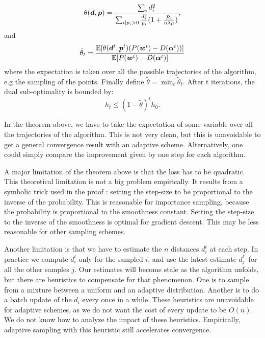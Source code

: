 \begin{subappendices}
\begin{theorem}
	\begin{equation}
		\theta(\bm d, \bm p) = \frac{\sum_i d_i^2}{\sum_{i | p_i >0} \frac{d_i^2}{p_i} (1+ \frac{R_i}{n \lambda \mu}) },
	\end{equation}
	and
	\begin{equation}
		\tilde \theta_t =  \frac{\operatorname{\mathbb{E}}[\theta(\bm d^t,\bm p^t) (P(\boldsymbol{w}^t) - D(\boldsymbol{\alpha}^t))] }{ \operatorname{\mathbb{E}}[P(\boldsymbol{w}^t) - D(\boldsymbol{\alpha}^t) ] }
	\end{equation}
	where the expectation is taken over all the possible trajectories of the algorithm, e.g the sampling of the points.
	Finally define $\tilde \theta = \min_t \tilde \theta_t$.
	After t iterations, the dual sub-optimality is bounded by:
	\begin{equation}
		h_t \leq (1- \tilde \theta )^t  h_0.
	\end{equation}
\end{theorem}

In the theorem above, we have to take the expectation of some variable over all the trajectories of the algorithm.
This is not very clean, but this is unavoidable to get a general convergence result with an adaptive scheme.
Alternatively, one could simply compare the improvement given by one step for each algorithm.

A major limitation of the theorem above is that the loss has to be quadratic.
This theoretical limitation is not a big problem empirically.
It results from a symbolic trick used in the proof : setting the step-size to be proportional to the inverse of the probability.
This is reasonable for importance sampling, because the probability is proportional to the smoothness constant.
Setting the step-size to the inverse of the smoothness is optimal for gradient descent.
This may be less reasonable for other sampling schemes.

Another limitation is that we have to estimate the $n$ distances $d_i^t$ at each step.
In practice we compute $d_i^t$ only for the sampled $i$, and use the latest estimate $d_j^{t'}$ for all the other samples $j$.
Our estimates will become stale as the algorithm unfolds, but there are heuristics to compensate for that phenomenon.
One is to sample from a mixture between a uniform and an adaptive distribution.
Another is to do a batch update of the $d_i$ every once in a while.
These heuristics are unavoidable for adaptive schemes, as we do not want the cost of every update to be $O(n)$.
We do not know how  to analyze the impact of these heuristics.
Empirically, adaptive sampling with this heuristic still accelerates convergence.


\end{subappendices}
